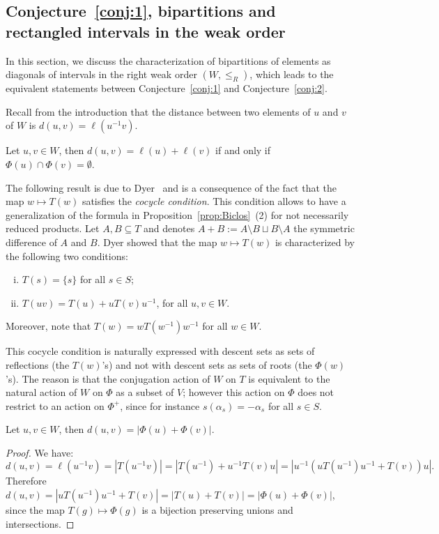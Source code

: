 \documentclass[ALCO,Unicode]{cedram}
\theoremstyle{definition}
\begin{document}
\subsection{Conjecture~\ref{conj:1}, bipartitions and rectangled intervals in the weak order}\label{ss:Rectangled}

In this section, we discuss the characterization of bipartitions of elements as diagonals of intervals in the right weak order $(W,\leq_R)$, which leads to the equivalent statements between  Conjecture~\ref{conj:1} and Conjecture~\ref{conj:2}. 

Recall from the introduction that the distance between two elements of $u$ and $v$ of $W$ is $d(u,v)=\ell(u^{-1}v)$. 

\begin{lemm}\label{lem:BH} Let $u,v\in W$, then $d(u,v)=\ell(u)+\ell(v)$ if and only if $\Phi(u)\cap\Phi(v)=\emptyset$. 
\end{lemm}

The following result is due to Dyer~\cite{Dy90} and is a consequence of the fact that the map $w\mapsto T(w)$ satisfies the {\em cocycle condition}. This condition allows  to have a generalization of the formula in Proposition~\ref{prop:Biclos}~(2) for not necessarily reduced products. Let $A,B\subseteq T$ and denotes $A+B:=A\setminus B\sqcup B\setminus A$ the symmetric difference of $A$ and $B$. Dyer showed that the map $w\mapsto T(w)$ is characterized by the following two conditions:
\begin{enumerate}[(i)]
\item $T(s)=\{s\}$ for all $s\in S$;
\item  $T(uv)=T(u)+uT(v)u^{-1}$, for all $u,v\in W$.
\end{enumerate}
Moreover, note that  $T(w)=wT(w^{-1})w^{-1}$ for all $w\in W$. 

\begin{remark} This cocycle condition is naturally expressed with descent sets as sets of reflections (the $T(w)$'s) and not with descent sets as sets of roots (the $\Phi(w)$'s). The reason is that the conjugation action of $W$ on $T$ is equivalent to the natural action of $W$ on $\Phi$ as a subset of $V$; however this action on $\Phi$ does not restrict to an action on $\Phi^+$, since for instance $s(\alpha_s)=-\alpha_s$ for all $s\in S$. 
\end{remark}

\begin{lemm}\label{lem:MaxInt} Let $u,v\in W$, then  $d(u,v)=|\Phi(u) + \Phi(v)|$. 
\end{lemm}
\begin{proof} We have:
$$
d(u,v)=\ell(u^{-1}v)=|T(u^{-1}v)|=|T(u^{-1})+u^{-1}T(v)u|=|u^{-1}(uT(u^{-1})u^{-1}+T(v))u|.
$$
Therefore $d(u,v)=|uT(u^{-1})u^{-1}+T(v)|=|T(u)+T(v)|=|\Phi(u)+\Phi(v)|$, since the map $T(g)\mapsto \Phi(g)$ is a bijection preserving unions and intersections. 
\end{proof}
\end{document}
